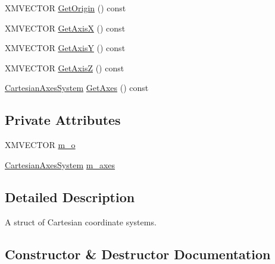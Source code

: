 \begin{DoxyCompactItemize}
\item 
X\+M\+V\+E\+C\+T\+OR \hyperlink{structmage_1_1_cartesian_coordinate_system_ac413d8f94f94102faa47d7c5cf8813b9}{Get\+Origin} () const
\item 
X\+M\+V\+E\+C\+T\+OR \hyperlink{structmage_1_1_cartesian_coordinate_system_ad79c4e6ae091d2a0268f1b9c1f06b7b2}{Get\+AxisX} () const
\item 
X\+M\+V\+E\+C\+T\+OR \hyperlink{structmage_1_1_cartesian_coordinate_system_a793c9783db21865ccf55f153cca963f3}{Get\+AxisY} () const
\item 
X\+M\+V\+E\+C\+T\+OR \hyperlink{structmage_1_1_cartesian_coordinate_system_ac152628841e8a51092b785bf62a64d98}{Get\+AxisZ} () const
\item 
\hyperlink{structmage_1_1_cartesian_axes_system}{Cartesian\+Axes\+System} \hyperlink{structmage_1_1_cartesian_coordinate_system_a291ba9d21e78af511bdd6358b3502eb4}{Get\+Axes} () const
\end{DoxyCompactItemize}
\subsection*{Private Attributes}
\begin{DoxyCompactItemize}
\item 
X\+M\+V\+E\+C\+T\+OR \hyperlink{structmage_1_1_cartesian_coordinate_system_a1ea373bb91be991ee221a2ce1e02be2b}{m\+\_\+o}
\item 
\hyperlink{structmage_1_1_cartesian_axes_system}{Cartesian\+Axes\+System} \hyperlink{structmage_1_1_cartesian_coordinate_system_acf7b8cf35026f5fa8fc11a126b96b055}{m\+\_\+axes}
\end{DoxyCompactItemize}


\subsection{Detailed Description}
A struct of Cartesian coordinate systems. 

\subsection{Constructor \& Destructor Documentation}
\hypertarget{structmage_1_1_cartesian_coordinate_system_a3f4a3309daccc818f06400a44f70b09b}{}\label{structmage_1_1_cartesian_coordinate_system_a3f4a3309daccc818f06400a44f70b09b} 
